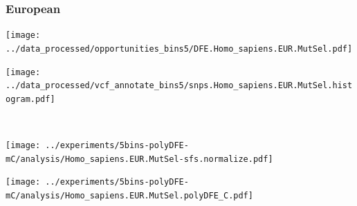 \subsubsection{European}

\begin{minipage}{0.49\linewidth}
    \texttt{[image: ../data\_processed/opportunities\_bins5/DFE.Homo\_sapiens.EUR.MutSel.pdf]}
\end{minipage}
\begin{minipage}{0.49\linewidth}
    \texttt{[image: ../data\_processed/vcf\_annotate\_bins5/snps.Homo\_sapiens.EUR.MutSel.histogram.pdf]}
\end{minipage}
\\
\begin{minipage}{0.49\linewidth}
    \texttt{[image: ../experiments/5bins-polyDFE-mC/analysis/Homo\_sapiens.EUR.MutSel-sfs.normalize.pdf]}
\end{minipage}
\begin{minipage}{0.4\linewidth}
    \texttt{[image: ../experiments/5bins-polyDFE-mC/analysis/Homo\_sapiens.EUR.MutSel.polyDFE\_C.pdf]}
\end{minipage}
